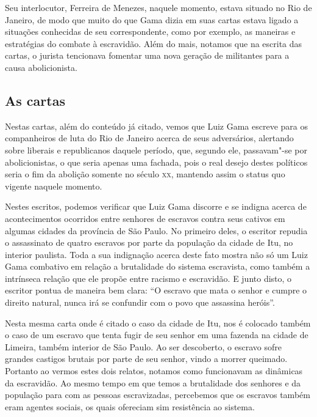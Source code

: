 \documentclass[12pt]{extarticle}
\begin{document}
Seu interlocutor, Ferreira de Menezes, naquele momento, estava situado
no Rio de Janeiro, de modo que muito do que Gama dizia em suas cartas
estava ligado a situações conhecidas de seu correspondente, como por
exemplo, as maneiras e estratégias do combate à escravidão. Além do
mais, notamos que na escrita das cartas, o jurista tencionava fomentar
uma nova geração de militantes para a causa abolicionista.

\subsection{As cartas}

Nestas cartas, além do conteúdo já citado, vemos que Luiz Gama escreve
para os companheiros de luta do Rio de Janeiro acerca de seus
adversários, alertando sobre liberais e republicanos daquele período,
que, segundo ele, passavam"-se por abolicionistas, o que seria apenas uma
fachada, pois o real desejo destes políticos seria o fim da abolição
somente no século \textsc{xx}, mantendo assim o status quo vigente naquele
momento.










Nestes escritos, podemos verificar que Luiz Gama discorre e se indigna
acerca de acontecimentos ocorridos entre senhores de escravos contra
seus cativos em algumas cidades da província de São Paulo. No primeiro
deles, o escritor repudia o assassinato de quatro escravos por parte da
população da cidade de Itu, no interior paulista. Toda a sua indignação
acerca deste fato mostra não só um Luiz Gama combativo em relação a
brutalidade do sistema escravista, como também a intrínseca relação que
ele propõe entre racismo e escravidão. E junto disto, o escritor pontua
de maneira bem clara: ``O escravo que mata o senhor e cumpre o direito
natural, nunca irá se confundir com o povo que assassina heróis''.

Nesta mesma carta onde é citado o caso da cidade de Itu, nos é colocado
também o caso de um escravo que tenta fugir de seu senhor em uma fazenda
na cidade de Limeira, também interior de São Paulo. Ao ser descoberto, o
escravo sofre grandes castigos brutais por parte de seu senhor, vindo a
morrer queimado. Portanto ao vermos estes dois relatos, notamos como
funcionavam as dinâmicas da escravidão. Ao mesmo tempo em que temos a
brutalidade dos senhores e da população para com as pessoas
escravizadas, percebemos que os escravos também eram agentes sociais, os
quais ofereciam sim resistência ao sistema.
\end{document}
